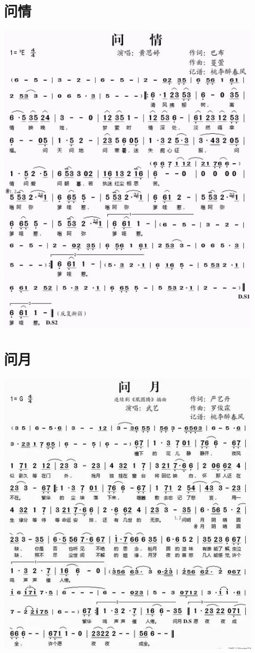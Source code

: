 \documentclass[cn,pad,twocol]{elegantbook}
\begin{document}
\section{问情}\includegraphics[width=\textwidth]{dongxiao/20200819/问情.png}
\section{问月}\includegraphics[width=\textwidth]{dongxiao/20200819/问月.jpeg}
\end{document}
